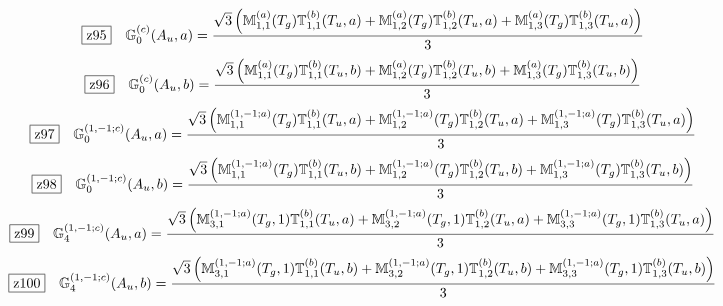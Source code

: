 \documentclass[fleqn,10pt,landscape]{jsarticle}
\begin{document}
\begin{dmath*}
\hspace*{3mm}\fbox{z95}\quad \mathbb{G}_{0}^{(c)}(A_{u},a)=\frac{\sqrt{3} \left(\mathbb{M}_{1,1}^{(a)}(T_{g}) \mathbb{T}_{1,1}^{(b)}(T_{u},a) + \mathbb{M}_{1,2}^{(a)}(T_{g}) \mathbb{T}_{1,2}^{(b)}(T_{u},a) + \mathbb{M}_{1,3}^{(a)}(T_{g}) \mathbb{T}_{1,3}^{(b)}(T_{u},a)\right)}{3}
\end{dmath*}
\begin{dmath*}
\hspace*{3mm}\fbox{z96}\quad \mathbb{G}_{0}^{(c)}(A_{u},b)=\frac{\sqrt{3} \left(\mathbb{M}_{1,1}^{(a)}(T_{g}) \mathbb{T}_{1,1}^{(b)}(T_{u},b) + \mathbb{M}_{1,2}^{(a)}(T_{g}) \mathbb{T}_{1,2}^{(b)}(T_{u},b) + \mathbb{M}_{1,3}^{(a)}(T_{g}) \mathbb{T}_{1,3}^{(b)}(T_{u},b)\right)}{3}
\end{dmath*}
\begin{dmath*}
\hspace*{3mm}\fbox{z97}\quad \mathbb{G}_{0}^{(1,-1;c)}(A_{u},a)=\frac{\sqrt{3} \left(\mathbb{M}_{1,1}^{(1,-1;a)}(T_{g}) \mathbb{T}_{1,1}^{(b)}(T_{u},a) + \mathbb{M}_{1,2}^{(1,-1;a)}(T_{g}) \mathbb{T}_{1,2}^{(b)}(T_{u},a) + \mathbb{M}_{1,3}^{(1,-1;a)}(T_{g}) \mathbb{T}_{1,3}^{(b)}(T_{u},a)\right)}{3}
\end{dmath*}
\begin{dmath*}
\hspace*{3mm}\fbox{z98}\quad \mathbb{G}_{0}^{(1,-1;c)}(A_{u},b)=\frac{\sqrt{3} \left(\mathbb{M}_{1,1}^{(1,-1;a)}(T_{g}) \mathbb{T}_{1,1}^{(b)}(T_{u},b) + \mathbb{M}_{1,2}^{(1,-1;a)}(T_{g}) \mathbb{T}_{1,2}^{(b)}(T_{u},b) + \mathbb{M}_{1,3}^{(1,-1;a)}(T_{g}) \mathbb{T}_{1,3}^{(b)}(T_{u},b)\right)}{3}
\end{dmath*}
\begin{dmath*}
\hspace*{3mm}\fbox{z99}\quad \mathbb{G}_{4}^{(1,-1;c)}(A_{u},a)=\frac{\sqrt{3} \left(\mathbb{M}_{3,1}^{(1,-1;a)}(T_{g},1) \mathbb{T}_{1,1}^{(b)}(T_{u},a) + \mathbb{M}_{3,2}^{(1,-1;a)}(T_{g},1) \mathbb{T}_{1,2}^{(b)}(T_{u},a) + \mathbb{M}_{3,3}^{(1,-1;a)}(T_{g},1) \mathbb{T}_{1,3}^{(b)}(T_{u},a)\right)}{3}
\end{dmath*}
\begin{dmath*}
\hspace*{3mm}\fbox{z100}\quad \mathbb{G}_{4}^{(1,-1;c)}(A_{u},b)=\frac{\sqrt{3} \left(\mathbb{M}_{3,1}^{(1,-1;a)}(T_{g},1) \mathbb{T}_{1,1}^{(b)}(T_{u},b) + \mathbb{M}_{3,2}^{(1,-1;a)}(T_{g},1) \mathbb{T}_{1,2}^{(b)}(T_{u},b) + \mathbb{M}_{3,3}^{(1,-1;a)}(T_{g},1) \mathbb{T}_{1,3}^{(b)}(T_{u},b)\right)}{3}
\end{dmath*}
\end{document}
